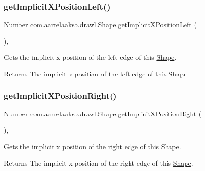\subsubsection{\texorpdfstring{get\+Implicit\+X\+Position\+Left()}{getImplicitXPositionLeft()}}
{\footnotesize\ttfamily \hyperlink{interfacecom_1_1aarrelaakso_1_1drawl_1_1_number}{Number} com.\+aarrelaakso.\+drawl.\+Shape.\+get\+Implicit\+X\+Position\+Left (\begin{DoxyParamCaption}{ }\end{DoxyParamCaption})\hspace{0.3cm}{\ttfamily [protected]}, {\ttfamily [inherited]}}



Gets the implicit x position of the left edge of this \hyperlink{classcom_1_1aarrelaakso_1_1drawl_1_1_shape}{Shape}. 

\begin{DoxyReturn}{Returns}
The implicit x position of the left edge of this \hyperlink{classcom_1_1aarrelaakso_1_1drawl_1_1_shape}{Shape}. 
\end{DoxyReturn}
\mbox{\label{classcom_1_1aarrelaakso_1_1drawl_1_1_shape_a15599ef4ee30a0ddd372f7cf1b155ce1}} 
\subsubsection{\texorpdfstring{get\+Implicit\+X\+Position\+Right()}{getImplicitXPositionRight()}}
{\footnotesize\ttfamily \hyperlink{interfacecom_1_1aarrelaakso_1_1drawl_1_1_number}{Number} com.\+aarrelaakso.\+drawl.\+Shape.\+get\+Implicit\+X\+Position\+Right (\begin{DoxyParamCaption}{ }\end{DoxyParamCaption})\hspace{0.3cm}{\ttfamily [protected]}, {\ttfamily [inherited]}}



Gets the implicit x position of the right edge of this \hyperlink{classcom_1_1aarrelaakso_1_1drawl_1_1_shape}{Shape}. 

\begin{DoxyReturn}{Returns}
The implicit x position of the right edge of this \hyperlink{classcom_1_1aarrelaakso_1_1drawl_1_1_shape}{Shape}. 
\end{DoxyReturn}
\mbox{\label{classcom_1_1aarrelaakso_1_1drawl_1_1_shape_a8d44b02976656bf4a81055a2dbae66cb}} 
